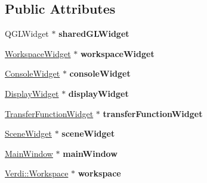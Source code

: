 \subsection*{\-Public \-Attributes}
\begin{DoxyCompactItemize}
\item 
\hypertarget{class_application_acc179ef71dea7370a8dc9578e42701ae}{\-Q\-G\-L\-Widget $\ast$ {\bfseries shared\-G\-L\-Widget}}\label{class_application_acc179ef71dea7370a8dc9578e42701ae}

\item 
\hypertarget{class_application_aff88b49d9cf5ca5c8e096a251f93002b}{\hyperlink{class_workspace_widget}{\-Workspace\-Widget} $\ast$ {\bfseries workspace\-Widget}}\label{class_application_aff88b49d9cf5ca5c8e096a251f93002b}

\item 
\hypertarget{class_application_ae6f9c74e4dd904908805f0ee336e0056}{\hyperlink{class_console_widget}{\-Console\-Widget} $\ast$ {\bfseries console\-Widget}}\label{class_application_ae6f9c74e4dd904908805f0ee336e0056}

\item 
\hypertarget{class_application_a45f4f2287d37fa5530a14c46c301a347}{\hyperlink{class_display_widget}{\-Display\-Widget} $\ast$ {\bfseries display\-Widget}}\label{class_application_a45f4f2287d37fa5530a14c46c301a347}

\item 
\hypertarget{class_application_a6c5285696e1d281d08c2ecde0ed74c48}{\hyperlink{class_transfer_function_widget}{\-Transfer\-Function\-Widget} $\ast$ {\bfseries transfer\-Function\-Widget}}\label{class_application_a6c5285696e1d281d08c2ecde0ed74c48}

\item 
\hypertarget{class_application_adf25e3529f8bd1b9dbec28be6f00ef6a}{\hyperlink{class_scene_widget}{\-Scene\-Widget} $\ast$ {\bfseries scene\-Widget}}\label{class_application_adf25e3529f8bd1b9dbec28be6f00ef6a}

\item 
\hypertarget{class_application_a57ca881642631b83badc09de4266a777}{\hyperlink{class_main_window}{\-Main\-Window} $\ast$ {\bfseries main\-Window}}\label{class_application_a57ca881642631b83badc09de4266a777}

\item 
\hypertarget{class_application_a98fbf5757895308402c1e11959f89506}{\hyperlink{class_verdi_1_1_workspace}{\-Verdi\-::\-Workspace} $\ast$ {\bfseries workspace}}\label{class_application_a98fbf5757895308402c1e11959f89506}


\end{DoxyCompactItemize}

